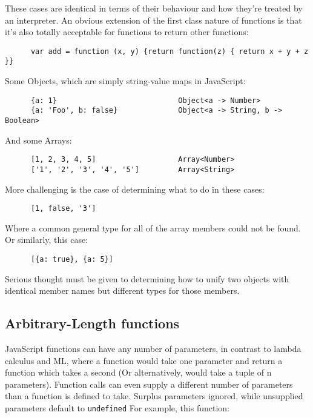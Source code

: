 \documentclass[british, twoside]{bhamthesis}
\theoremstyle{definition}
\begin{document}
    These cases are identical in terms of their behaviour and how they're treated by an interpreter. An obvious extension of the first class nature of functions is that it's also totally acceptable for functions to return other functions:

    \begin{lstlisting}
      var add = function (x, y) {return function(z) { return x + y + z }}
    \end{lstlisting}

    Some Objects, which are simply string-value maps in JavaScript:

    \begin{lstlisting}
      {a: 1}                            Object<a -> Number>
      {a: 'Foo', b: false}              Object<a -> String, b -> Boolean>
    \end{lstlisting}

    And some Arrays:

    \begin{lstlisting}
      [1, 2, 3, 4, 5]                   Array<Number>
      ['1', '2', '3', '4', '5']         Array<String>
    \end{lstlisting}

    More challenging is the case of determining what to do in these cases:

    \begin{lstlisting}
      [1, false, '3']
    \end{lstlisting}

    Where a common general type for all of the array members could not be found. Or similarly, this case:

    \begin{lstlisting}
      [{a: true}, {a: 5}]
    \end{lstlisting}

    Serious thought must be given to determining how to unify two objects with identical member names but different types for those members.

  \subsection{Arbitrary-Length functions}
    JavaScript functions can have any number of parameters, in contrast to lambda calculus and ML, where a function would take one parameter and return a function which takes a second (Or alternatively, would take a tuple of n parameters). Function calls can even supply a different number of parameters than a function is defined to take. Surplus parameters ignored, while unsupplied parameters default to \texttt {undefined} For example, this function:
\end{document}
